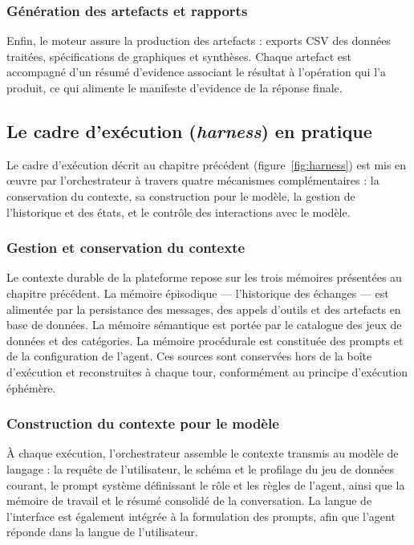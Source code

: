 \subsubsection{Génération des artefacts et rapports}

Enfin, le moteur assure la production des artefacts : exports CSV des données traitées, spécifications de graphiques et synthèses. Chaque artefact est accompagné d'un résumé d'evidence associant le résultat à l'opération qui l'a produit, ce qui alimente le manifeste d'evidence de la réponse finale.

\subsection{Le cadre d'exécution (\textit{harness}) en pratique}

Le cadre d'exécution décrit au chapitre précédent (figure~\ref{fig:harness}) est mis en œuvre par l'orchestrateur à travers quatre mécanismes complémentaires : la conservation du contexte, sa construction pour le modèle, la gestion de l'historique et des états, et le contrôle des interactions avec le modèle.

\subsubsection{Gestion et conservation du contexte}

Le contexte durable de la plateforme repose sur les trois mémoires présentées au chapitre précédent. La mémoire épisodique — l'historique des échanges — est alimentée par la persistance des messages, des appels d'outils et des artefacts en base de données. La mémoire sémantique est portée par le catalogue des jeux de données et des catégories. La mémoire procédurale est constituée des prompts et de la configuration de l'agent. Ces sources sont conservées hors de la boîte d'exécution et reconstruites à chaque tour, conformément au principe d'exécution éphémère.

\subsubsection{Construction du contexte pour le modèle}

À chaque exécution, l'orchestrateur assemble le contexte transmis au modèle de langage : la requête de l'utilisateur, le schéma et le profilage du jeu de données courant, le prompt système définissant le rôle et les règles de l'agent, ainsi que la mémoire de travail et le résumé consolidé de la conversation. La langue de l'interface est également intégrée à la formulation des prompts, afin que l'agent réponde dans la langue de l'utilisateur.

